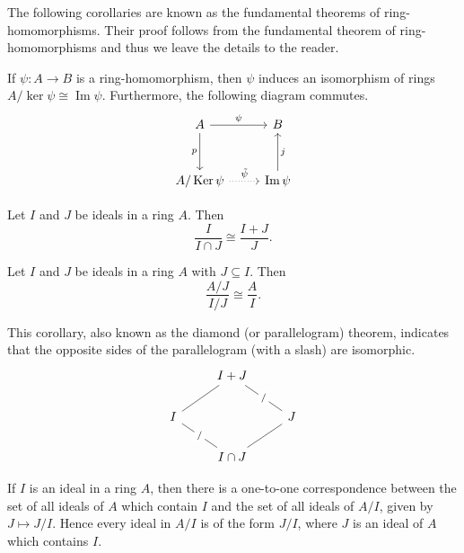 \documentclass[11pt,a4paper]{article}
\begin{document}
The following corollaries are known as the fundamental theorems of ring-homomorphisms.
Their proof follows from the fundamental theorem of ring-homomorphisms and thus we leave the details to the reader.

\begin{cor}
    If $\psi  \colon A \to B$ is a ring-homomorphism, then $\psi $ induces an isomorphism of rings $A / \ker \psi  \cong \operatorname{Im} \psi $.
    Furthermore, the following diagram commutes.
    \[
\begin{tikzcd}[row sep={3em}]
A \arrow[r, "\psi"] \arrow[d, "p"'] & B \\
A / \ker \psi \arrow[r, "\tilde{\psi}", dotted] & \operatorname{Im} \psi \arrow[u, "j"']
\end{tikzcd}
\]
\end{cor}

\begin{cor}
    Let $I$ and $J$ be ideals in a ring $A$.
    Then \[\frac{I}{I\cap J} \cong \frac{I+J}{J}.\]
\end{cor}


\begin{cor}
    Let $I$ and $J$ be ideals in a ring $A$ with \(J\subseteq I\).
    Then \[\frac{A/J}{I / J} \cong \frac{A}{I}.\]
\end{cor}

This corollary, also known as the diamond (or parallelogram) theorem, indicates that  the opposite sides of the parallelogram (with a slash) are isomorphic.
\[\begin{tikzcd}
    & I+J \arrow[ld, no head] \arrow[rd, "/" description, no head] &                       \\
I \arrow[rd, "/" description, no head] &                                                               & J \arrow[ld, no head] \\
    & I\cap J                                                       &                      
\end{tikzcd}\]


\begin{cor}
    If $I$ is an ideal in a ring $A$, then there is a one-to-one correspondence between the set of all ideals of $A$ which contain $I$ and the set of all ideals of $A/I$, given by $J \mapsto J/I$. Hence every ideal in $A/I$ is of the form $J/I$, where $J$ is an ideal of $A$ which contains $I$.
\end{cor}
\end{document}
